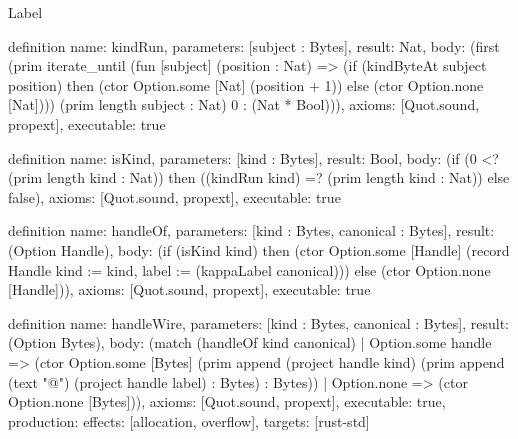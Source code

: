 \begin{lexlean}{Label}
\begin{semanticmodule}
definition{
  name: kindRun,
  parameters: [subject : Bytes],
  result: Nat,
  body: (first (prim iterate_until (fun [subject] (position : Nat) => (if (kindByteAt subject position) then (ctor Option.some [Nat] (position + 1)) else (ctor Option.none [Nat]))) (prim length subject : Nat) 0 : (Nat * Bool))),
  axioms: [Quot.sound, propext],
  executable: true
}

definition{
  name: isKind,
  parameters: [kind : Bytes],
  result: Bool,
  body: (if (0 <? (prim length kind : Nat)) then ((kindRun kind) =? (prim length kind : Nat)) else false),
  axioms: [Quot.sound, propext],
  executable: true
}

definition{
  name: handleOf,
  parameters: [kind : Bytes, canonical : Bytes],
  result: (Option Handle),
  body: (if (isKind kind) then (ctor Option.some [Handle] (record Handle {kind := kind, label := (kappaLabel canonical)})) else (ctor Option.none [Handle])),
  axioms: [Quot.sound, propext],
  executable: true
}

definition{
  name: handleWire,
  parameters: [kind : Bytes, canonical : Bytes],
  result: (Option Bytes),
  body: (match (handleOf kind canonical)
    | Option.some handle => (ctor Option.some [Bytes] (prim append (project handle kind) (prim append (text "@") (project handle label) : Bytes) : Bytes))
    | Option.none => (ctor Option.none [Bytes])),
  axioms: [Quot.sound, propext],
  executable: true,
  production: {effects: [allocation, overflow], targets: [rust-std]}
}
\end{semanticmodule}
\end{lexlean}
